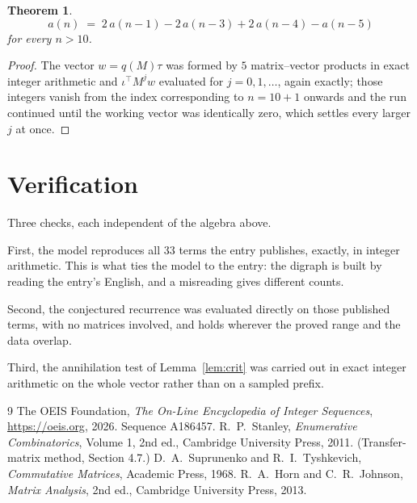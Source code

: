 \documentclass[11pt,a4paper]{article}
\theoremstyle{plain}
\newtheorem{theorem}{Theorem}
\theoremstyle{definition}
\begin{document}
\begin{theorem}
\[
a(n)\;=\;2\,a(n-1) - 2\,a(n-3) + 2\,a(n-4) - a(n-5)
\]
for every $n>10$.
\end{theorem}

\begin{proof}
The vector $w=q(M)\tau$ was formed by $5$ matrix--vector products in exact integer
arithmetic and $\iota^{\!\top}M^{j}w$ evaluated for $j=0,1,\dots$, again exactly; those
integers vanish from the index corresponding to $n=10+1$ onwards and the run continued
until the working vector was identically zero, which settles every larger $j$ at once.
\end{proof}

\section{Verification}

Three checks, each independent of the algebra above.

First, the model reproduces all $33$ terms the entry publishes, exactly, in integer
arithmetic. This is what ties the model to the entry: the digraph is built by reading the
entry's English, and a misreading gives different counts.

Second, the conjectured recurrence was evaluated directly on those published terms, with no
matrices involved, and holds wherever the proved range and the data overlap.

Third, the annihilation test of Lemma~\ref{lem:crit} was carried out in exact integer
arithmetic on the whole vector rather than on a sampled prefix.

\begin{thebibliography}{9}
 The OEIS Foundation, \emph{The On-Line Encyclopedia of Integer
Sequences}, \url{https://oeis.org}, 2026. Sequence A186457.
 R.~P.~Stanley, \emph{Enumerative Combinatorics}, Volume 1, 2nd ed.,
Cambridge University Press, 2011. (Transfer-matrix method, Section 4.7.)
 D.~A.~Suprunenko and R.~I.~Tyshkevich, \emph{Commutative Matrices},
Academic Press, 1968.
 R.~A.~Horn and C.~R.~Johnson, \emph{Matrix Analysis}, 2nd ed., Cambridge
University Press, 2013.
\end{thebibliography}
\end{document}
